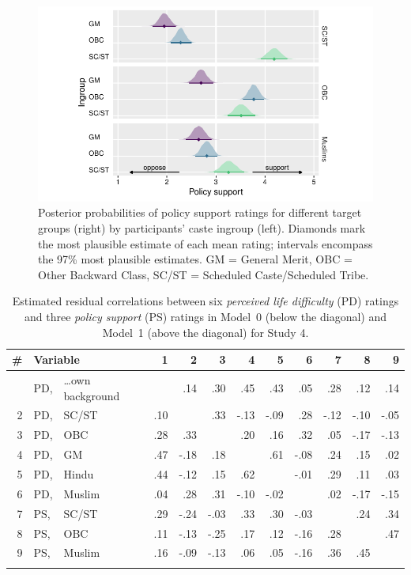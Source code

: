 \documentclass[12pt, a4paper]{article}
\begin{document}
\begin{figure}
\centering
\includegraphics[scale=1]{../figures/figure-8}
\caption{
Posterior probabilities of policy support ratings for different target groups (right) by participants' caste ingroup (left). Diamonds mark the most plausible estimate of each mean rating; intervals encompass the 97\% most plausible estimates. GM = General Merit, OBC = Other Backward Class, SC/ST = Scheduled Caste/Scheduled Tribe.
}
\label{fig:e-2}
\end{figure}

\begin{table}
\centering
{}
\caption[Estimated residual correlations in Models 0 and 1 for Study 4]{Estimated residual correlations between six \emph{perceived life difficulty} (PD) ratings and three \emph{policy support} (PS) ratings in Model~0 (below the diagonal) and Model~1 (above the diagonal) for Study 4.}
\small	
\begin{tabularx}{\linewidth}{rl@{~}Xrrrrrr|rrr} \toprule
\# & \multicolumn{2}{l}{Variable} & 1 & 2 & 3 & 4 & 5 & 6 & 7 & 8 & 9 \\ \midrule \addlinespace
1 & PD, & \ldots own background & \textbf{}  & .14 & .30 & .45 & .43 & .05 & .28 & .12 & .14 \\
2 & PD, & SC/ST  & .10 & \textbf{} & .33 & -.13 & -.09 & .28 & -.12 & -.10 & -.05 \\
3 & PD, & OBC    & .28 & .33 & \textbf{} & .20 & .16 & .32 & .05 & -.17 & -.13  \\
4 & PD, & GM     & .47 & -.18 & .18 & \textbf{} & .61 & -.08 & .24 & .15 & .02 \\
5 & PD, & Hindu  & .44 & -.12 & .15 & .62 & \textbf{} & -.01 & .29 & .11 & .03  \\
6 & PD, & Muslim & .04 & .28 & .31 & -.10 & -.02 & \textbf{} & .02 & -.17 & -.15 \\ \midrule
7 & PS, & SC/ST  & .29 & -.24 & -.03 & .33 & .30 & -.03 & \textbf{} & .24 & .34 \\
8 & PS, & OBC    & .11 & -.13 & -.25 & .17 & .12 & -.16 & .28 & \textbf{} & .47 \\
9 & PS, & Muslim & .16 & -.09 & -.13 & .06 & .05 & -.16 & .36 & .45 & \textbf{}   \\ \addlinespace \bottomrule
\end{tabularx}
\label{tab:e-1}
\end{table}
\end{document}
